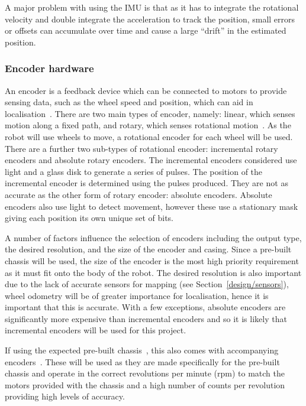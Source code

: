 A major problem with using the IMU is that as it has to integrate the rotational velocity and double integrate the acceleration to track the position, small errors or offsets can accumulate over time and cause a large ``drift'' in the estimated position.


\subsubsection{Encoder hardware}\label{design/sensors/encoder}

An encoder is a feedback device which can be connected to motors to provide
sensing data, such as the wheel speed and position, which can aid in localisation~\cite[p.~60]{braunl_embedded_2013}.
There are two main types of encoder, namely: linear, which senses motion along
a fixed path, and rotary, which senses rotational motion~\cite[p.~60]{braunl_embedded_2013}.
As the robot will use wheels to move, a rotational encoder for each wheel will be used.
There are a further two sub-types of rotational encoder: incremental rotary encoders and absolute rotary encoders. The incremental encoders considered use light and a glass disk to generate a series of
pulses. The position of the incremental encoder is determined using the pulses produced.
They are not as accurate as the other form of rotary encoder: absolute encoders.
Absolute encoders also use light to detect movement, however these use a
stationary mask giving each position its own unique set of bits.

A number of factors influence the selection of encoders including the output
type, the desired resolution, and the size of the encoder and casing. Since a pre-built
chassis will be used, the size of the encoder is the most high priority requirement as
it must fit onto the body of the robot. The desired resolution is also important due to
the lack of accurate sensors for mapping (see Section~\ref{design/sensors}), wheel odometry will be
of greater importance for localisation, hence it is important that this is accurate.
With a few exceptions, absolute encoders are significantly more expensive than
incremental encoders and so it is likely that incremental encoders will be used for
this project.

If using the expected pre-built chassis~\cite{pololuchassis},
this also comes with accompanying encoders~\cite{pololuencoder}.
These will be used as they are made specifically for the pre-built chassis and operate in the
correct revolutions per minute (rpm) to match the motors provided with the chassis and a high number of counts per revolution providing high levels of accuracy.

